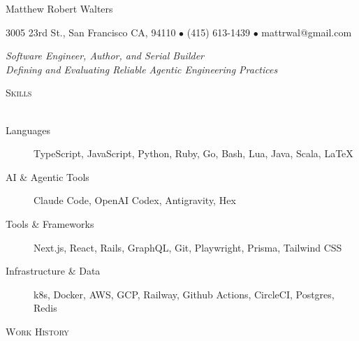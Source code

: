 \documentclass{article}
\newcommand{\lineunder}{\vspace*{-8pt} \\ \hspace*{-18pt} \hrulefill \\}
\newcommand{\header}[1]{{\hspace*{-15pt}\vspace*{6pt} \textsc{#1}} \vspace*{-6pt} \lineunder}
\begin{document}
\small
\smallskip
\vspace*{-44pt}


\begin{center}
 
\huge Matthew Robert Walters 
\linebreak
\normalsize

{3005 23rd St., San Francisco CA, 94110 $\bullet$ (415) 613-1439 $\bullet$ mattrwal@gmail.com} \newline

 \textit{Software Engineer, Author, and Serial Builder} \\
 \textit{Defining and Evaluating Reliable Agentic Engineering Practices}
\end{center}

\small

\header{Skills}

\begin{description}

\item[Languages] TypeScript, JavaScript, Python, Ruby, Go, Bash, Lua, Java, Scala, \LaTeX             
\item[AI \& Agentic Tools] Claude Code, OpenAI Codex, Antigravity, Hex
\item[Tools \& Frameworks] Next.js, React, Rails, GraphQL, Git, Playwright, Prisma, Tailwind CSS
\item[Infrastructure \& Data] k8s, Docker, AWS, GCP, Railway, Github Actions, CircleCI, Postgres, Redis

\end{description}

\header{Work History}
\end{document}
